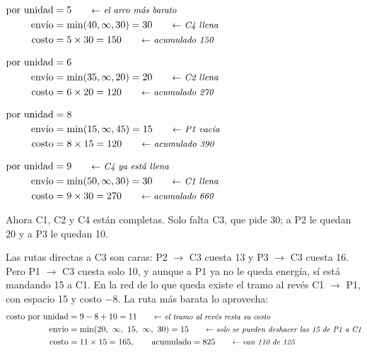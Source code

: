\documentclass[11pt,a4paper]{article}
\newcommand{\ra}{\ensuremath{\to}}
\begin{document}
\noindent
\begin{minipage}[t]{0.49\textwidth}
$\begin{aligned}
\text{por unidad} &= 5 \nota{el arco más barato}\\
\text{envío} &= \min(40, \infty, 30) = 30 \nota{C4 llena}\\
\text{costo} &= 5 \times 30 = 150 \nota{acumulado 150}
\end{aligned}$
\end{minipage}\hfill
\begin{minipage}[t]{0.49\textwidth}
$\begin{aligned}
\text{por unidad} &= 6\\
\text{envío} &= \min(35, \infty, 20) = 20 \nota{C2 llena}\\
\text{costo} &= 6 \times 20 = 120 \nota{acumulado 270}
\end{aligned}$
\end{minipage}

\noindent
\begin{minipage}[t]{0.49\textwidth}
$\begin{aligned}
\text{por unidad} &= 8\\
\text{envío} &= \min(15, \infty, 45) = 15 \nota{P1 vacía}\\
\text{costo} &= 8 \times 15 = 120 \nota{acumulado 390}
\end{aligned}$
\end{minipage}\hfill
\begin{minipage}[t]{0.49\textwidth}
$\begin{aligned}
\text{por unidad} &= 9 \nota{C4 ya está llena}\\
\text{envío} &= \min(50, \infty, 30) = 30 \nota{C1 llena}\\
\text{costo} &= 9 \times 30 = 270 \nota{acumulado 660}
\end{aligned}$
\end{minipage}

\medskip
Ahora C1, C2 y C4 están completas. Solo falta C3, que pide 30; a P2 le quedan 20 y a P3 le quedan 10.

Las rutas directas a C3 son caras: P2 \ra{} C3 cuesta 13 y P3 \ra{} C3 cuesta 16. Pero P1 \ra{} C3 cuesta solo 10, y
aunque a P1 ya no le queda energía, sí está mandando 15 a C1. En la red de lo que queda existe el tramo al revés
C1 \ra{} P1, con espacio 15 y costo $-8$. La ruta más barata lo aprovecha:
\begin{align*}
\text{costo por unidad} &= 9 - 8 + 10 = 11 \nota{el tramo al revés resta su costo}\\
\text{envío} &= \min(20,\ \infty,\ 15,\ \infty,\ 30) = 15 \nota{solo se pueden deshacer las 15 de P1 a C1}\\
\text{costo} &= 11 \times 15 = 165, \qquad \text{acumulado} = 825 \nota{van 110 de 125}
\end{align*}
\end{document}
